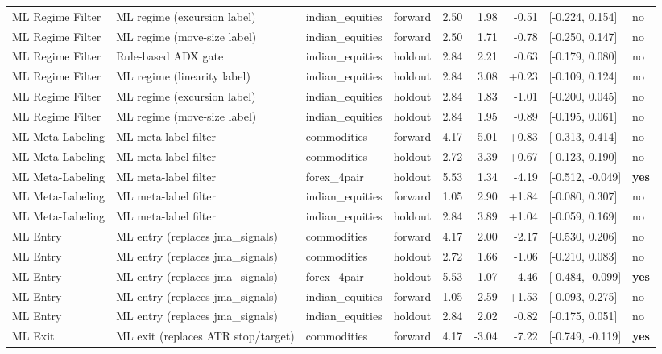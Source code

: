 \begin{longtable}{l l l l r r r l l}
ML Regime Filter & ML regime (excursion label) & indian\_equities & forward & 2.50 & 1.98 & -0.51 & [-0.224, 0.154] & no \\
ML Regime Filter & ML regime (move-size label) & indian\_equities & forward & 2.50 & 1.71 & -0.78 & [-0.250, 0.147] & no \\
ML Regime Filter & Rule-based ADX gate & indian\_equities & holdout & 2.84 & 2.21 & -0.63 & [-0.179, 0.080] & no \\
ML Regime Filter & ML regime (linearity label) & indian\_equities & holdout & 2.84 & 3.08 & +0.23 & [-0.109, 0.124] & no \\
ML Regime Filter & ML regime (excursion label) & indian\_equities & holdout & 2.84 & 1.83 & -1.01 & [-0.200, 0.045] & no \\
ML Regime Filter & ML regime (move-size label) & indian\_equities & holdout & 2.84 & 1.95 & -0.89 & [-0.195, 0.061] & no \\
ML Meta-Labeling & ML meta-label filter & commodities & forward & 4.17 & 5.01 & +0.83 & [-0.313, 0.414] & no \\
ML Meta-Labeling & ML meta-label filter & commodities & holdout & 2.72 & 3.39 & +0.67 & [-0.123, 0.190] & no \\
ML Meta-Labeling & ML meta-label filter & forex\_4pair & holdout & 5.53 & 1.34 & -4.19 & [-0.512, -0.049] & \textbf{yes} \\
ML Meta-Labeling & ML meta-label filter & indian\_equities & forward & 1.05 & 2.90 & +1.84 & [-0.080, 0.307] & no \\
ML Meta-Labeling & ML meta-label filter & indian\_equities & holdout & 2.84 & 3.89 & +1.04 & [-0.059, 0.169] & no \\
ML Entry & ML entry (replaces jma\_signals) & commodities & forward & 4.17 & 2.00 & -2.17 & [-0.530, 0.206] & no \\
ML Entry & ML entry (replaces jma\_signals) & commodities & holdout & 2.72 & 1.66 & -1.06 & [-0.210, 0.083] & no \\
ML Entry & ML entry (replaces jma\_signals) & forex\_4pair & holdout & 5.53 & 1.07 & -4.46 & [-0.484, -0.099] & \textbf{yes} \\
ML Entry & ML entry (replaces jma\_signals) & indian\_equities & forward & 1.05 & 2.59 & +1.53 & [-0.093, 0.275] & no \\
ML Entry & ML entry (replaces jma\_signals) & indian\_equities & holdout & 2.84 & 2.02 & -0.82 & [-0.175, 0.051] & no \\
ML Exit & ML exit (replaces ATR stop/target) & commodities & forward & 4.17 & -3.04 & -7.22 & [-0.749, -0.119] & \textbf{yes} \\

\end{longtable}
